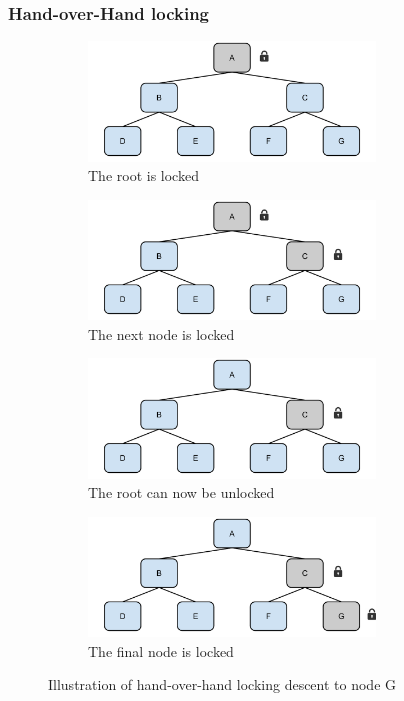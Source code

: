 \documentclass[11pt,a4paper]{globis-book}
\begin{document}
\subsubsection{Hand-over-Hand locking}

\begin{figure}[t]
    \centering
    \begin{subfigure}[b]{0.5\linewidth}
        \includegraphics[width = 3in]{images/Tree-HoH-a}
        \caption{The root is locked}
    \end{subfigure}%
    \begin{subfigure}[b]{0.5\linewidth}
        \includegraphics[width = 3in]{images/Tree-HoH-b}
        \caption{The next node is locked}
    \end{subfigure}
    \begin{subfigure}[b]{0.5\linewidth}
        \includegraphics[width = 3in]{images/Tree-HoH-c}
        \caption{The root can now be unlocked}
    \end{subfigure}%
    \begin{subfigure}[b]{0.5\linewidth}
        \includegraphics[width = 3in]{images/Tree-HoH-d}
        \caption{The final node is locked}
    \end{subfigure}
    \caption{Illustration of hand-over-hand locking descent to node G}
    \label{fig:locking-hoh}
\end{figure}
\end{document}
